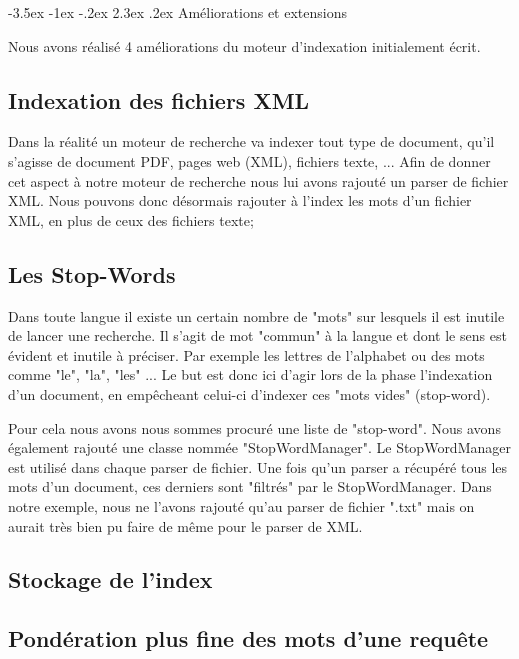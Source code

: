 \documentclass[a4paper,12pt]{article}
\makeatletter
\renewcommand\section{\@startsection {section}{1}{\z@}%
                           {-3.5ex \@plus -1ex \@minus -.2ex}%
                           {2.3ex \@plus.2ex}%
                           {\normalfont\Large\bfseries}}
\makeatother
\begin{document}
\section{Améliorations et extensions}

Nous avons réalisé 4 améliorations du moteur d'indexation initialement écrit.

\subsection{Indexation des fichiers XML}

Dans la réalité un moteur de recherche va indexer tout type de document, qu'il s'agisse de document PDF, pages web (XML), fichiers texte, ...
Afin de donner cet aspect à notre moteur de recherche nous lui avons rajouté un parser de fichier XML. Nous pouvons donc désormais rajouter à l'index les mots d'un fichier XML, en plus de ceux des fichiers texte;

\subsection{Les Stop-Words}

Dans toute langue il existe un certain nombre de "mots" sur lesquels il est inutile de lancer une recherche. Il s'agit de mot "commun" à la langue et dont le sens est évident et inutile à préciser. Par exemple les lettres de l'alphabet ou des mots comme "le", "la", "les" ... Le but est donc ici d'agir lors de la phase l'indexation d'un document, en empêcheant celui-ci d'indexer ces "mots vides" (stop-word).

Pour cela nous avons nous sommes procuré une liste de "stop-word". Nous avons également rajouté une classe nommée "StopWordManager". Le StopWordManager est utilisé dans chaque parser de fichier. Une fois qu'un parser a récupéré tous les mots d'un document, ces derniers sont "filtrés" par le StopWordManager. Dans notre exemple, nous ne l'avons rajouté qu'au parser de fichier ".txt" mais on aurait très bien pu faire de même pour le parser de XML.

\subsection{Stockage de l'index}

\subsection{Pondération plus fine des mots d'une requête}
\end{document}
